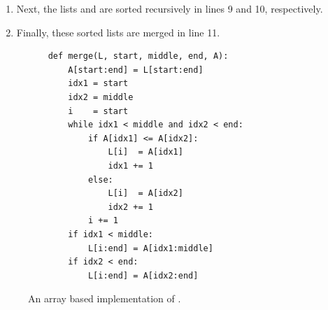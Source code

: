 \begin{enumerate}
      \hspace*{1.3cm} 
      \\[0.2cm]
      This way, the list $\mytt{L}$ is split into the lists 
      \\[0.2cm]
      \hspace*{1.3cm}
       \quad and \quad {}.
      \\[0.2cm]
      These two lists have approximately the same size which is about half the size of the list $\mytt{L}$.
\item Next, the lists  and  are sorted
      recursively in lines 9 and 10, respectively.
\item Finally, these sorted lists are merged in line 11.
\end{enumerate}

\begin{figure}[!ht]
  \centering
\begin{verbatim}
    def merge(L, start, middle, end, A):
        A[start:end] = L[start:end]
        idx1 = start
        idx2 = middle
        i    = start
        while idx1 < middle and idx2 < end:
            if A[idx1] <= A[idx2]:
                L[i]  = A[idx1]
                idx1 += 1
            else:
                L[i]  = A[idx2]
                idx2 += 1
            i += 1
        if idx1 < middle:
            L[i:end] = A[idx1:middle]
        if idx2 < end:
            L[i:end] = A[idx2:end]
\end{verbatim}
\vspace*{-0.3cm}
  \caption{An array based implementation of .}
  \label{fig:merge-sort-array.stlx-merge}
\end{figure}

